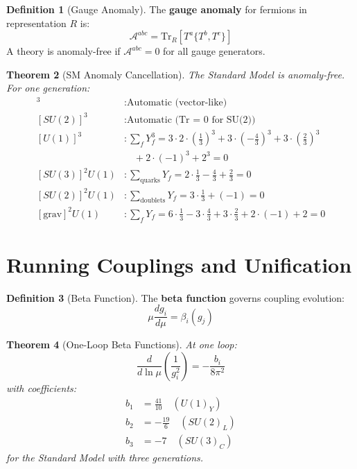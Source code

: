 \documentclass[11pt,a4paper,openright]{book}
\theoremstyle{plain}
\newtheorem{theorem}{Theorem}[chapter]
\theoremstyle{definition}
\newtheorem{definition}[theorem]{Definition}
\newcommand{\Tr}{\mathrm{Tr}}
\begin{document}
\begin{definition}[Gauge Anomaly]
The \textbf{gauge anomaly} for fermions in representation $R$ is:
\begin{equation}
\mathcal{A}^{abc} = \Tr_R[T^a \{T^b, T^c\}]
\end{equation}
A theory is anomaly-free if $\mathcal{A}^{abc} = 0$ for all gauge generators.
\end{definition}

\begin{theorem}[SM Anomaly Cancellation]
The Standard Model is anomaly-free. For one generation:
\begin{align}
[SU(3)]^3 &: \text{Automatic (vector-like)} \\
[SU(2)]^3 &: \text{Automatic (Tr = 0 for SU(2))} \\
[U(1)]^3 &: \sum_f Y_f^3 = 3 \cdot 2 \cdot (\frac{1}{3})^3 + 3 \cdot (-\frac{4}{3})^3 + 3 \cdot (\frac{2}{3})^3 \\
&\quad + 2 \cdot (-1)^3 + 2^3 = 0 \\
[SU(3)]^2 U(1) &: \sum_{\text{quarks}} Y_f = 2 \cdot \frac{1}{3} - \frac{4}{3} + \frac{2}{3} = 0 \\
[SU(2)]^2 U(1) &: \sum_{\text{doublets}} Y_f = 3 \cdot \frac{1}{3} + (-1) = 0 \\
[\text{grav}]^2 U(1) &: \sum_f Y_f = 6 \cdot \frac{1}{3} - 3 \cdot \frac{4}{3} + 3 \cdot \frac{2}{3} + 2 \cdot (-1) + 2 = 0
\end{align}
\end{theorem}

\section{Running Couplings and Unification}

\begin{definition}[Beta Function]
The \textbf{beta function} governs coupling evolution:
\begin{equation}
\mu \frac{dg_i}{d\mu} = \beta_i(g_j)
\end{equation}
\end{definition}

\begin{theorem}[One-Loop Beta Functions]
At one loop:
\begin{equation}
\frac{d}{d\ln\mu}\left(\frac{1}{g_i^2}\right) = -\frac{b_i}{8\pi^2}
\end{equation}
with coefficients:
\begin{align}
b_1 &= \frac{41}{10} \quad (U(1)_Y) \\
b_2 &= -\frac{19}{6} \quad (SU(2)_L) \\
b_3 &= -7 \quad (SU(3)_C)
\end{align}
for the Standard Model with three generations.
\end{theorem}
\end{document}
